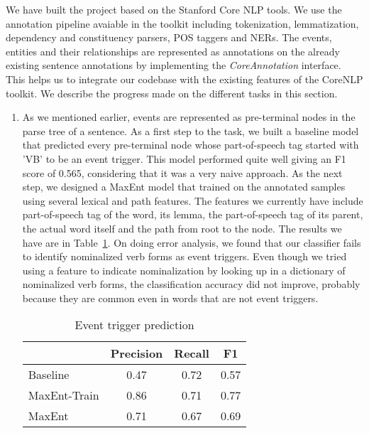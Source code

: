 We have built the project based on the Stanford Core NLP tools. We use the annotation pipeline avaiable in the toolkit including tokenization, lemmatization, dependency and constituency parsers, POS taggers and NERs. The events, entities and their relationships are represented as annotations on the already existing sentence annotations by implementing the {\em CoreAnnotation} interface. This helps us to integrate our codebase with the existing features of the CoreNLP toolkit. We describe the progress made on the different tasks in this section.

\begin{enumerate}

\item {} As we mentioned earlier, events are represented as pre-terminal nodes in the parse tree of a sentence. As a first step to the task, we built a baseline model that predicted every pre-terminal node whose part-of-speech tag started with 'VB' to be an event trigger. This model performed quite well giving an F1 score of 0.565, considering that it was a very naive approach. As the next step, we designed a MaxEnt model that trained on the annotated samples using several lexical and path features. The features we currently have include part-of-speech tag of the word, its lemma, the part-of-speech tag of its parent, the actual word itself and the path from root to the node. The results we have are in Table~\ref{table:eventprediction}. On doing error analysis, we found that our classifier fails to identify nominalized verb forms as event triggers. Even though we tried using a feature to indicate nominalization by looking up in a dictionary of nominalized verb forms, the classification accuracy did not improve, probably because they are common even in words that are not event triggers.

\begin{table}
\centering
\begin{tabular}{|l||c|c|c|} \hline
&\textbf{Precision} & \textbf{Recall} & \textbf{F1} \\ \hline
\hline
Baseline& 0.47 & 0.72&0.57\\
MaxEnt-Train& 0.86 & 0.71&  0.77 \\
MaxEnt&0.71&0.67&0.69\\
\hline
\end{tabular}
\caption{Event trigger prediction}
\label{table:eventprediction}
\end{table}


\end{enumerate}

